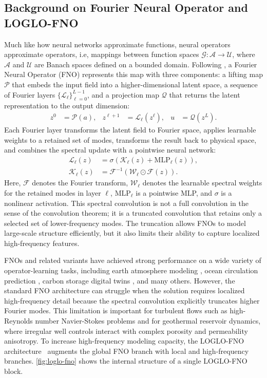 \documentclass[pdflatex,sn-mathphys-ay]{sn-jnl}
\begin{document}
\subsection{Background on Fourier Neural Operator and LOGLO-FNO}
\label{sec:background_fno}
Much like how neural networks approximate functions, neural operators approximate operators, i.e,
mappings between function spaces 
$\mathcal{G}: \mathcal{A}\rightarrow\mathcal{U}$, where $\mathcal{A}$ and
$\mathcal{U}$ are Banach spaces defined on a bounded domain. Following
\cite{li2021fno}, a Fourier Neural Operator (FNO) represents this map with
three components: a lifting map $\mathcal{P}$ that embeds the input field into a
higher-dimensional latent space, a sequence of Fourier layers
$\{\mathcal{L}_{\ell}\}_{\ell=0}^{L-1}$, and a projection map $\mathcal{Q}$ that
returns the latent representation to the output dimension:
\begin{align}
z^{0} &= \mathcal{P}(a), &
z^{\ell+1} &= \mathcal{L}_{\ell}(z^{\ell}), &
u &= \mathcal{Q}(z^{L}).
\end{align}
Each Fourier layer transforms the latent field to Fourier space, applies
learnable weights to a retained set of modes, transforms the result back to
physical space, and combines the spectral update with a pointwise neural
network:
\begin{align}
\mathcal{L}_{\ell}(z)
&= \sigma\!\left(\mathcal{K}_{\ell}(z)+\mathrm{MLP}_{\ell}(z)\right), \\
\mathcal{K}_{\ell}(z)
&= \mathcal{F}^{-1}\!\left(
  \mathcal{W}_{\ell}\odot\mathcal{F}(z)
\right).
\end{align}
Here, $\mathcal{F}$ denotes the Fourier transform, $\mathcal{W}_{\ell}$ denotes
the learnable spectral weights for the retained modes in layer $\ell$,
$\mathrm{MLP}_{\ell}$ is a pointwise MLP, and $\sigma$ is a nonlinear activation.
This spectral convolution is not a full convolution in the sense of the
convolution theorem; it is a truncated convolution that retains only a selected
set of lower-frequency modes. The truncation allows FNOs to model large-scale
structure efficiently, but it also limits their ability to capture localized
high-frequency features.

FNOs and related variants have achieved strong performance on a wide variety of
operator-learning tasks, including earth atmosphere modeling \citep{fourcastnet3}, ocean
circulation prediction \citep{oceancirculation}, carbon storage digital twins 
\citep{carbonstorage}, and many others. 
However, the standard FNO
architecture can struggle when the solution requires localized high-frequency
detail because the spectral convolution explicitly truncates higher Fourier
modes. This limitation is important for turbulent flows such as high-Reynolds
number Navier-Stokes problems and for geothermal reservoir dynamics, where
irregular well controls interact with complex porosity and permeability
anisotropy. To increase high-frequency modeling capacity, the LOGLO-FNO
architecture~\citep{loglofno} augments the global FNO branch with local and
high-frequency branches. \cref{fig:loglo-fno} shows the internal structure of a
single LOGLO-FNO block.
\end{document}
